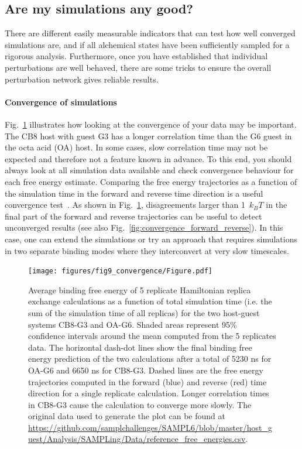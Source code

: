 \documentclass[9pt,bestpractices]{livecoms}
\begin{document}
\subsection{Are my simulations any good?}
\label{sec:are-they-good}
There are different easily measurable indicators that can test how well converged simulations are, and if all alchemical states have been sufficiently sampled for a rigorous analysis. Furthermore, once you have established that individual perturbations are well behaved, there are some tricks to ensure the overall perturbation network gives reliable results.

\paragraph{Convergence of simulations}
Fig.~\ref{fig:freeenergytrajectories} illustrates how looking at the convergence of your data may be important. The CB8 host with guest G3 has a longer correlation time than the G6 guest in the octa acid (OA) host. In some cases, slow correlation time may not be expected and therefore not a feature known in advance. To this end, you should always look at all simulation data available and check convergence behaviour for each free energy estimate.
Comparing the free energy trajectories as a function of the simulation time in the forward and reverse time direction is a useful convergence test~\cite{klimovich2015guidelines}.
As shown in Fig.~\ref{fig:freeenergytrajectories}, disagreements larger than 1~$k_{B}T$ in the final part of the forward and reverse trajectories can be useful to detect unconverged results (see also Fig.~\ref{fig:convergence_forward_reverse}).
In this case, one can extend the simulations or try an approach that requires simulations in two separate binding modes where they interconvert at very slow timescales.  
\begin{figure}
    \texttt{[image: figures/fig9\_convergence/Figure.pdf]}
    \caption{Average binding free energy of 5 replicate Hamiltonian replica exchange calculations as a function of total simulation time (i.e. the sum of the simulation time of all replicas) for the two host-guest systems CB8-G3 and OA-G6. Shaded areas represent 95\% confidence intervals around the mean computed from the 5 replicates data. The horizontal dash-dot lines show the final binding free energy prediction of the two calculations after a total of 5230 ns for OA-G6 and 6650 ns for CB8-G3. Dashed lines are the free energy trajectories computed in the forward (blue) and reverse (red) time direction for a single replicate calculation. Longer correlation times in CB8-G3 cause the calculation to converge more slowly. The original data used to generate the plot can be found at \url{https://github.com/samplchallenges/SAMPL6/blob/master/host_guest/Analysis/SAMPLing/Data/reference_free_energies.csv}.
}
    \label{fig:freeenergytrajectories}
\end{figure}
\end{document}
